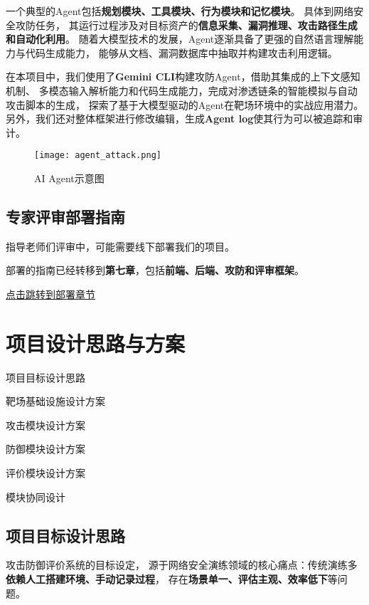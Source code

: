 \documentclass[lang=cn,10pt]{elegantbook}
\begin{document}
一个典型的Agent包括\textbf{规划模块、工具模块、行为模块和记忆模块}。
具体到网络安全攻防任务，
其运行过程涉及对目标资产的\textbf{信息采集、漏洞推理、攻击路径生成和自动化利用}。
随着大模型技术的发展，Agent逐渐具备了更强的自然语言理解能力与代码生成能力，
能够从文档、漏洞数据库中抽取并构建攻击利用逻辑。

在本项目中，我们使用了\textbf{Gemini CLI}构建攻防Agent，借助其集成的上下文感知机制、
多模态输入解析能力和代码生成能力，完成对渗透链条的智能模拟与自动攻击脚本的生成，
探索了基于大模型驱动的Agent在靶场环境中的实战应用潜力。
另外，我们还对整体框架进行修改编辑，生成\textbf{Agent log}使其行为可以被追踪和审计。

\begin{figure}[!h]
\centering
\texttt{[image: agent\_attack.png]}  %
\caption{AI Agent示意图}  %
\label{fig:ai_agent}  %
\end{figure}

\section{专家评审部署指南}

指导老师们评审中，可能需要线下部署我们的项目。

部署的指南已经转移到\textbf{第七章}，包括\textbf{前端、后端、攻防和评审框架}。


\hyperlink{chap:deploy}{点击跳转到部署章节}


\chapter{项目设计思路与方案}
\begin{introduction}
  \item 项目目标设计思路
  \item 靶场基础设施设计方案
  \item 攻击模块设计方案
  \item 防御模块设计方案
  \item 评价模块设计方案
  \item 模块协同设计
\end{introduction}
\section{项目目标设计思路}

攻击防御评价系统的目标设定，
源于网络安全演练领域的核心痛点：传统演练多\textbf{依赖人工搭建环境、手动记录过程}，
存在\textbf{场景单一、评估主观、效率低下}等问题。
\end{document}
